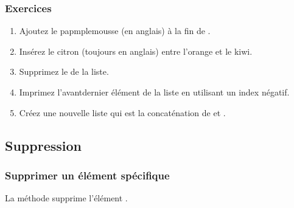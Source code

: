 \documentclass[letterpaper,10pt,english]{sphinxmanual}
\begin{document}
\subsubsection{Exercices}
\label{\detokenize{src/OCI02_Listes:exercices}}\begin{enumerate}
%
\item {} 
Ajoutez le papmplemousse (en anglais) à la fin de .

\item {} 
Insérez le citron (toujours en anglais) entre l’orange et le kiwi.

\item {} 
Supprimez le  de la liste.

\item {} 
Imprimez l’avant\sphinxhyphen{}dernier élément de la liste en utilisant un index négatif.

\item {} 
Créez une nouvelle liste  qui est la concaténation de  et .

\end{enumerate}


\subsection{Suppression}
\label{\detokenize{src/OCI02_Listes:suppression}}

\subsubsection{Supprimer un élément spécifique}
\label{\detokenize{src/OCI02_Listes:supprimer-un-element-specifique}}
La méthode  supprime l’élément .

\begin{sphinxVerbatim}[commandchars=\\\{\}]
  \PYG{p}{[}      \PYG{p}{]}
\end{sphinxVerbatim}
\end{document}
